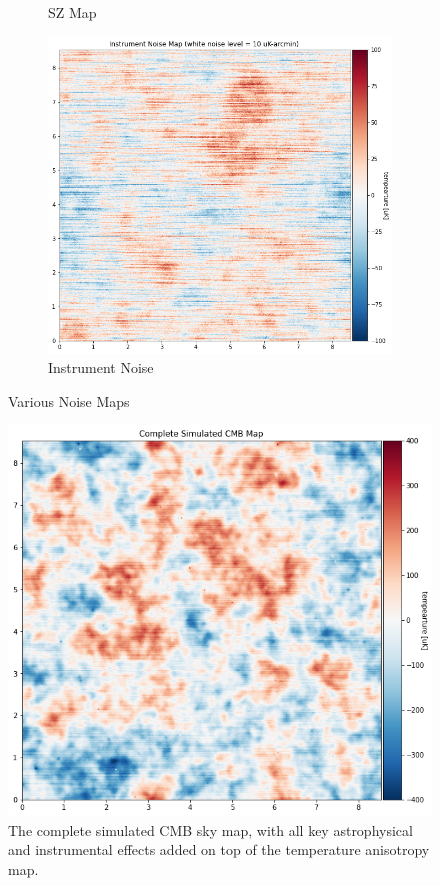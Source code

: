 \documentclass[12pt]{article}
\begin{document}
\begin{figure}[h]
\begin{subfigure}[t]{0.3\textwidth}
        \caption{SZ Map}
        \label{fig:sz_map}
    \end{subfigure}
    \hfill
    \begin{subfigure}[t]{0.3\textwidth}
        \centering
        \includegraphics[width=\textwidth]{images/Instrument noise.png}
        \caption{Instrument Noise}
        \label{fig:instrument_noise}
    \end{subfigure}
    \caption{Various Noise Maps}
    \label{fig:my_label}
\end{figure}

\begin{figure}[H]
    \centering
    \includegraphics[width=\textwidth]{images/complete simulated CMB Map.png}
    \caption{The complete simulated CMB sky map, with all key astrophysical and instrumental effects added on top of the temperature anisotropy map.}
    \label{fig:complete_map}
\end{figure}
\end{document}
